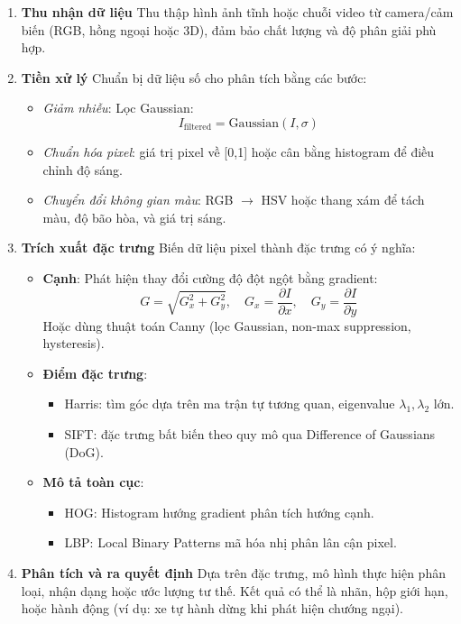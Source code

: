\begin{enumerate}
    \item \textbf{Thu nhận dữ liệu}  
    Thu thập hình ảnh tĩnh hoặc chuỗi video từ camera/cảm biến (RGB, hồng ngoại hoặc 3D), đảm bảo chất lượng và độ phân giải phù hợp.\autocite{szeliski2010}
    
    \item \textbf{Tiền xử lý}  
    Chuẩn bị dữ liệu số cho phân tích bằng các bước:
    \begin{itemize}
        \item \emph{Giảm nhiễu}: Lọc Gaussian: 
        \[
            I_{\text{filtered}} = \text{Gaussian}(I, \sigma)
        \]
        \item \emph{Chuẩn hóa pixel}: giá trị pixel về [0,1] hoặc cân bằng histogram để điều chỉnh độ sáng.
        \item \emph{Chuyển đổi không gian màu}: RGB $\to$ HSV hoặc thang xám để tách màu, độ bão hòa, và giá trị sáng.
    \end{itemize}\autocite{szeliski2010}
    
    \item \textbf{Trích xuất đặc trưng}  
    Biến dữ liệu pixel thành đặc trưng có ý nghĩa:
    \begin{itemize}
        \item \textbf{Cạnh}: Phát hiện thay đổi cường độ đột ngột bằng gradient:
        \[
            G = \sqrt{G_x^2 + G_y^2}, \quad
            G_x = \frac{\partial I}{\partial x}, \quad
            G_y = \frac{\partial I}{\partial y}
        \]
        Hoặc dùng thuật toán Canny (lọc Gaussian, non-max suppression, hysteresis).\autocite{sobel1968,canny1986}
        
        \item \textbf{Điểm đặc trưng}:  
        \begin{itemize}
            \item Harris: tìm góc dựa trên ma trận tự tương quan, eigenvalue $\lambda_1, \lambda_2$ lớn.
            \item SIFT: đặc trưng bất biến theo quy mô qua Difference of Gaussians (DoG).\autocite{lowe1999}
        \end{itemize}

        \item \textbf{Mô tả toàn cục}:
        \begin{itemize}
            \item HOG: Histogram hướng gradient phân tích hướng cạnh.
            \item LBP: Local Binary Patterns mã hóa nhị phân lân cận pixel.\autocite{dalal2005}
        \end{itemize}
    \end{itemize}
    
    \item \textbf{Phân tích và ra quyết định}  
    Dựa trên đặc trưng, mô hình thực hiện phân loại, nhận dạng hoặc ước lượng tư thế. Kết quả có thể là nhãn, hộp giới hạn, hoặc hành động (ví dụ: xe tự hành dừng khi phát hiện chướng ngại).\autocite{horn1981}
\end{enumerate}


